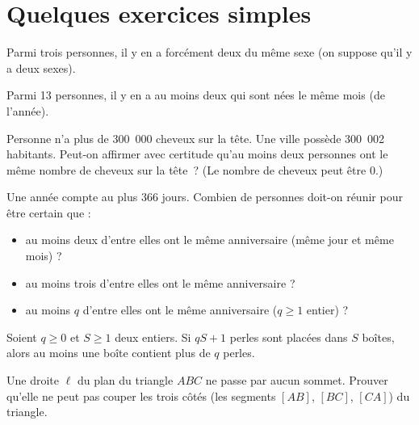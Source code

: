\section*{Quelques exercices simples}
    \begin{exercise}
        Parmi trois personnes, il y en a forcément deux du même sexe (on suppose qu'il y a deux sexes).
    \end{exercise}

    \begin{exercise}[Anniversaires]
        Parmi 13 personnes, il y en a au moins deux qui sont nées le même mois (de l'année).
    \end{exercise}

    \begin{exercise}
        Personne n’a plus de 300~000 cheveux sur la tête. Une ville possède 300~002 habitants.
        Peut-on affirmer avec certitude qu’au moins deux personnes ont le même nombre de cheveux sur la tête ? (Le nombre de cheveux peut être $0$.)
    \end{exercise}

    \begin{exercise}
        Une année compte au plus $366$ jours. Combien de personnes doit-on réunir pour être certain que :
        \begin{itemize}
            \item au moins deux d'entre elles ont le même anniversaire (même jour et même mois) ?
            \item au moins trois d'entre elles ont le même anniversaire ?
            \item au moins \( q \) d'entre elles ont le même anniversaire (\( q \geq 1 \) entier) ?
        \end{itemize}
    \end{exercise}

    \begin{exercise}
    Soient \( q \geq 0 \) et \( S \geq 1 \) deux entiers. Si \( qS + 1 \) perles sont placées dans \( S \) boîtes, alors au moins une boîte contient plus de \( q \) perles.
    \end{exercise}

    \begin{exercise}
    Une droite \( \ell \) du plan du triangle \( ABC \) ne passe par aucun sommet.
    Prouver qu'elle ne peut pas couper les trois côtés (les segments \( [AB] \), \( [BC] \), \( [CA] \)) du triangle.
    \end{exercise}

